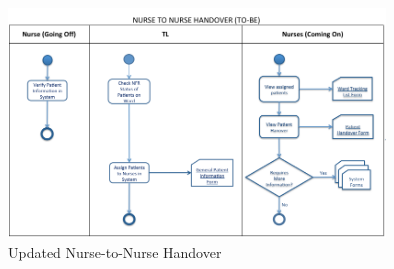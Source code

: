 \begin{figure}[hp]
				\centering
				\includegraphics[angle=-90,scale=1.0, width=100mm]{Images/Nurse-to-Nurse-Handover-Process-To-Be}
				\caption{Updated Nurse-to-Nurse Handover}
\end{figure} 

